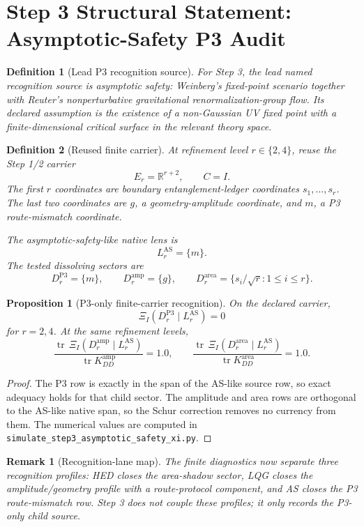 \documentclass[11pt]{article}
\newtheorem{definition}{Definition}
\newtheorem{proposition}{Proposition}
\newtheorem{remark}{Remark}
\DeclareMathOperator{\tr}{tr}
\begin{document}
\section*{Step 3 Structural Statement: Asymptotic-Safety P3 Audit}

\begin{definition}[Lead P3 recognition source]
For Step 3, the lead named recognition source is asymptotic safety:
Weinberg's fixed-point scenario together with Reuter's nonperturbative
gravitational renormalization-group flow.  Its declared assumption is the
existence of a non-Gaussian UV fixed point with a finite-dimensional critical
surface in the relevant theory space.
\end{definition}

\begin{definition}[Reused finite carrier]
At refinement level \(r\in\{2,4\}\), reuse the Step 1/2 carrier
\[
  E_r=\mathbb{R}^{r+2},\qquad C=I.
\]
The first \(r\) coordinates are boundary entanglement-ledger coordinates
\(s_1,\ldots,s_r\).  The last two coordinates are \(g\), a
geometry-amplitude coordinate, and \(m\), a P3 route-mismatch coordinate.

The asymptotic-safety-like native lens is
\[
  L^{\mathrm{AS}}_r=\{m\}.
\]
The tested dissolving sectors are
\[
  D^{\mathrm{P3}}_r=\{m\},\qquad
  D^{\mathrm{amp}}_r=\{g\},\qquad
  D^{\mathrm{area}}_r=\{s_i/\sqrt r:1\le i\le r\}.
\]
\end{definition}

\begin{proposition}[P3-only finite-carrier recognition]
On the declared carrier,
\[
  \Xi_I(D^{\mathrm{P3}}_r\mid L^{\mathrm{AS}}_r)=0
\]
for \(r=2,4\).  At the same refinement levels,
\[
  \frac{\tr\,\Xi_I(D^{\mathrm{amp}}_r\mid L^{\mathrm{AS}}_r)}
       {\tr K_{DD}^{\mathrm{amp}}}=1.0,
  \qquad
  \frac{\tr\,\Xi_I(D^{\mathrm{area}}_r\mid L^{\mathrm{AS}}_r)}
       {\tr K_{DD}^{\mathrm{area}}}=1.0 .
\]
\end{proposition}

\begin{proof}
The P3 row is exactly in the span of the AS-like source row, so exact
adequacy holds for that child sector.  The amplitude and area rows are
orthogonal to the AS-like native span, so the Schur correction removes no
currency from them.  The numerical values are computed in
\texttt{simulate\_step3\_asymptotic\_safety\_xi.py}.
\end{proof}

\begin{remark}[Recognition-lane map]
The finite diagnostics now separate three recognition profiles: HED closes
the area-shadow sector, LQG closes the amplitude/geometry profile with a
route-protocol component, and AS closes the P3 route-mismatch row.  Step 3
does not couple these profiles; it only records the P3-only child source.
\end{remark}
\end{document}
